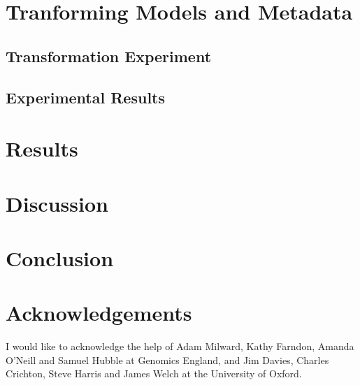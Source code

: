 \documentclass[runningheads]{llncs}
\begin{document}
	\section{Tranforming Models and Metadata}
	\subsection{Transformation Experiment}
	\subsection{Experimental Results}
	\section{Results}
	\section{Discussion}
	\section{Conclusion}
	
	
	
	\section{Acknowledgements}
	I would like to acknowledge the help of Adam Milward, Kathy Farndon, Amanda O'Neill and Samuel Hubble at Genomics England, and Jim Davies, Charles Crichton, Steve Harris and James Welch at the University of Oxford.
%	



	
	
\end{document}
